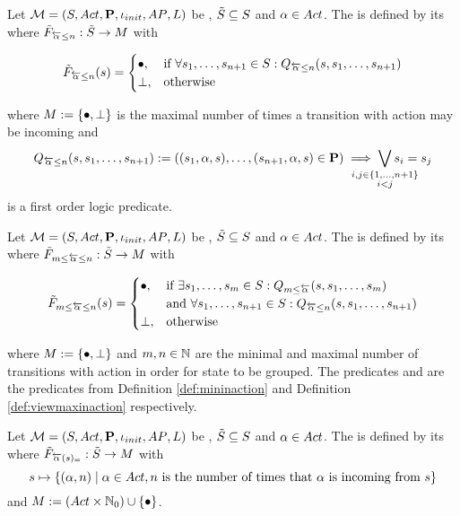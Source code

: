 \documentclass[preview]{standalone}
\begin{document}
\begin{definition}
	Let $\chgph = \chgphtuple$ be \achgphN, $\smstates \subseteq \states$ and $\action \in \actions$. The \viewN \viewmaxinaction is defined by its \grpfctN \gfctmaxinaction where $\gfctsubmaxinaction : \smstates \to \imggrp$ with

	\[
	\gfctsubmaxinaction(\state) =
	\begin{cases}
			\remelem,				& \text{if } \forall \state_1, \dots, \state_{\numinact+1} \in \states: \predmaxinact \\
			\notppty,          	& \text{otherwise}
		\end{cases}
	\]
	
	where $\imggrp := \imggrpbinview$
	 is the maximal number of times a transition with action \action may be incoming and 
	\[
	\predmaxinact := ((\state_1, \action, \state), \dots, (\state_{\numinact+1}, \action, \state) \in \trans) \implies \bigvee_{\mathclap{\substack{i,j \in \{1,\dots, \numinact+1\} \\ i < j}}} \state_i = \state_j
	\]
	is a first order logic predicate.
\end{definition}

\begin{definition}
	Let $\chgph = \chgphtuple$ be \achgphN, $\smstates \subseteq \states$ and $\action \in \actions$. The \viewN 
	\viewspaninaction is defined by its \grpfctN where $\gfctsubspaninaction : \smstates \to \imggrp$ with

	\[
	\gfctsubspaninaction(\state) =
	\begin{cases}
			\remelem,				& \text{if } \exists \state_1, \dots, \state_\numinactb \in \states: \predmininact[\numinactb] \\ &\text{and } \forall \state_1, \dots, \state_{\numinact+1} \in \states: \predmaxinact \\
			\notppty,          	& \text{otherwise}
		\end{cases}
	\]
	
	where $\imggrp := \imggrpbinview$
	and $\numinactb, \numinact \in \natnums$ are the minimal and maximal number of transitions with action \action in order for state to be grouped. The predicates \predmininact and \predmaxinact are the predicates from Definition \ref{def:mininaction} and Definition \ref{def:viewmaxinaction} respectively.
\end{definition}

\begin{definition}
	Let $\chgph = \chgphtuple$ be \achgphN, $\smstates \subseteq \states$ and $\action \in \actions$. The \viewN \viewstronginactident is defined by its \grpfctN \gfctstronginactident where $\gfctsubstronginactident : \smstates \to \imggrp$ with
	\[
	\state \mapsto	
	\{(\action, \numinact) \mid \action \in \actions, \numinact \text{ is the number of times that \action is incoming from } \state\}
	\]
	and $\imggrp := (\actions \times \natnums_0) \cup \remset$.
\end{definition}
\end{document}
